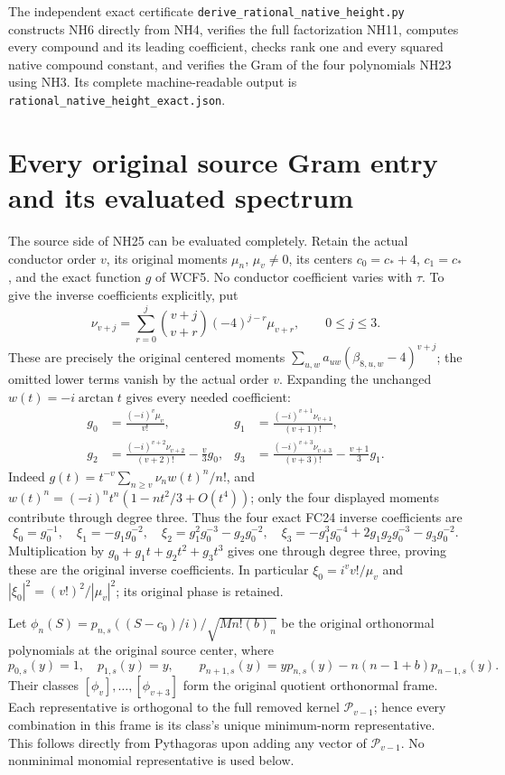 The independent exact certificate
\texttt{derive\_rational\_native\_height.py} constructs NH6
directly from NH4, verifies the full factorization NH11,
computes every compound and its leading coefficient,
checks rank one and every squared native compound constant,
and verifies the Gram of the four polynomials NH23 using
NH3. Its complete machine-readable output is
\texttt{rational\_native\_height\_exact.json}.

\section{Every original source Gram entry and its evaluated spectrum}
The source side of NH25 can be evaluated completely. Retain
the actual conductor order $v$, its original moments $\mu_n$,
$\mu_v\ne0$, its centers $c_0=c_*+4$, $c_1=c_*$, and the
exact function $g$ of WCF5. No conductor coefficient varies
with $\tau$. To give the inverse coefficients explicitly, put
\[
 \nu_{v+j}=\sum_{r=0}^j\binom{v+j}{v+r}(-4)^{j-r}\mu_{v+r},
 \qquad 0\le j\le3.
 \tag{NH26}
\]
These are precisely the original centered moments
$\sum_{u,w}a_{uw}(\beta_{8,u,w}-4)^{v+j}$; the omitted
lower terms vanish by the actual order $v$. Expanding the
unchanged $w(t)=-i\arctan t$ gives every needed coefficient:
\[
\begin{aligned}
 g_0&=\frac{(-i)^v\mu_v}{v!},&
 g_1&=\frac{(-i)^{v+1}\nu_{v+1}}{(v+1)!},\\
 g_2&=\frac{(-i)^{v+2}\nu_{v+2}}{(v+2)!}
                           -\frac v3g_0,&
 g_3&=\frac{(-i)^{v+3}\nu_{v+3}}{(v+3)!}
                           -\frac{v+1}{3}g_1.
\end{aligned}\tag{NH27}
\]
Indeed $g(t)=t^{-v}\sum_{n\ge v}\nu_nw(t)^n/n!$,
and $w(t)^n=(-i)^nt^n(1-nt^2/3+O(t^4))$; only the
four displayed moments contribute through degree three.
Thus the four exact FC24 inverse coefficients are
\[
 \xi_0=g_0^{-1},\quad \xi_1=-g_1g_0^{-2},\quad
 \xi_2=g_1^2g_0^{-3}-g_2g_0^{-2},\quad
 \xi_3=-g_1^3g_0^{-4}+2g_1g_2g_0^{-3}-g_3g_0^{-2}.
 \tag{NH28}
\]
Multiplication by $g_0+g_1t+g_2t^2+g_3t^3$ gives one
through degree three, proving these are the original inverse
coefficients. In particular
$\xi_0=i^vv!/\mu_v$ and
$|\xi_0|^2=(v!)^2/|\mu_v|^2$; its original phase is retained.

Let $\phi_n(S)=p_{n,s}((S-c_0)/i)/\sqrt{Mn!(b)_n}$ be
the original orthonormal polynomials at the original source
center, where
\[
 p_{0,s}(y)=1,\quad p_{1,s}(y)=y,\qquad
 p_{n+1,s}(y)=yp_{n,s}(y)-n(n-1+b)p_{n-1,s}(y).
 \tag{NH29}
\]
Their classes $[\phi_v],\ldots,[\phi_{v+3}]$ form the
original quotient orthonormal frame. Each representative is
orthogonal to the full removed kernel $\mathcal P_{v-1}$;
hence every combination in this frame is its class's unique
minimum-norm representative. This follows directly from
Pythagoras upon adding any vector of $\mathcal P_{v-1}$.
No nonminimal monomial representative is used below.


